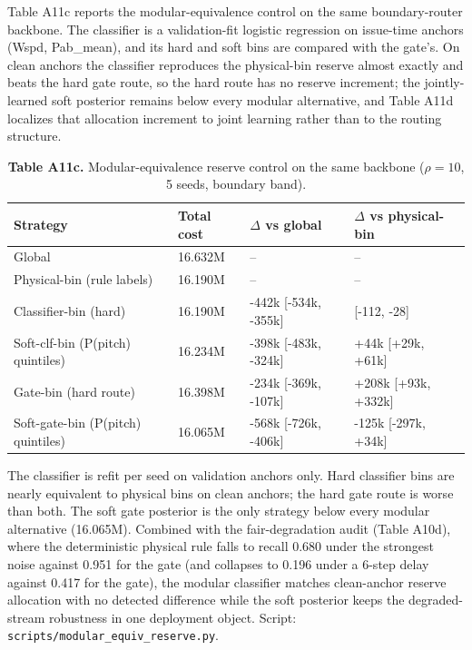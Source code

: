 \documentclass[
  journal]{IEEEtran}
\begin{document}
Table A11c reports the modular-equivalence control on the same
boundary-router backbone. The classifier is a validation-fit logistic
regression on issue-time anchors (Wspd, Pab\_mean), and its hard and
soft bins are compared with the gate's. On clean anchors the classifier
reproduces the physical-bin reserve almost exactly and beats the hard
gate route, so the hard route has no reserve increment; the
jointly-learned soft posterior remains below every modular alternative,
and Table A11d localizes that allocation increment to joint learning
rather than to the routing structure.

\begin{table}[!t]
\centering
\fontsize{8.0pt}{9.6pt}\selectfont
\setlength{\tabcolsep}{2.4pt}
\renewcommand{\arraystretch}{1.03}
\caption*{\textbf{Table A11c.} Modular-equivalence reserve control on the same backbone ($\rho=10$, 5 seeds, boundary band).}
\begin{tabularx}{\linewidth}{>{\raggedright\arraybackslash}X >{\centering\arraybackslash}p{} >{\centering\arraybackslash}p{} >{\centering\arraybackslash}p{}}
\toprule
Strategy & Total cost & $\Delta$ vs global & $\Delta$ vs physical-bin \\
\midrule
Global & 16.632M & -- & -- \\
Physical-bin (rule labels) & 16.190M & -- & -- \\
Classifier-bin (hard) & 16.190M & -442k [-534k, -355k] & -68 [-112, -28] \\
Soft-clf-bin (P(pitch) quintiles) & 16.234M & -398k [-483k, -324k] & +44k [+29k, +61k] \\
Gate-bin (hard route) & 16.398M & -234k [-369k, -107k] & +208k [+93k, +332k] \\
Soft-gate-bin (P(pitch) quintiles) & 16.065M & -568k [-726k, -406k] & -125k [-297k, +34k] \\
\bottomrule
\end{tabularx}
\vspace{1mm}
\fontsize{8.0pt}{9.6pt}\selectfont The classifier is refit per seed on validation anchors only. Hard classifier bins are nearly equivalent to physical bins on clean anchors; the hard gate route is worse than both. The soft gate posterior is the only strategy below every modular alternative (16.065M). Combined with the fair-degradation audit (Table A10d), where the deterministic physical rule falls to recall 0.680 under the strongest noise against 0.951 for the gate (and collapses to 0.196 under a 6-step delay against 0.417 for the gate), the modular classifier matches clean-anchor reserve allocation with no detected difference while the soft posterior keeps the degraded-stream robustness in one deployment object. Script: \texttt{scripts/modular\_equiv\_reserve.py}.
\end{table}
\end{document}
